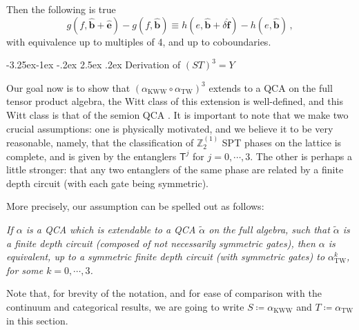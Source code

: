 \documentclass[aps,twocolumn,prx,floatfix,preprintnumbers, nofootinbib,10pt]{revtex4-2}
\makeatletter
\numberwithin{equation}{section}
\theoremstyle{definition}
\theoremstyle{remark}
\theoremstyle{claim}
\newcommand{\be}{\begin{equation}}
\newcommand{\ee}{\end{equation}}
\newcommand{\KWW}{\text{KWW}}
\newcommand{\TW}{\text{TW}}
\newcommand{\aTW}{\alpha_\text{TW}}
\newcommand{\Z}{{\mathbb Z}}
\renewcommand\subsubsection{\@startsection{subsubsection}{3}{\z@}%
                                     {-3.25ex\@plus -1ex \@minus -.2ex}%
                                     {2.5ex \@plus .2ex}%
                                     {\centering\itshape\bfseries\small}}
\renewcommand{\sf}[1]{\mathsf{#1}}
\makeatother
\begin{document}
Then the following is true
\be
g(f, \bm{\hat{b}} + \bm{\hat{e}}) - g(f, \bm{\hat{b}}) \equiv h(e, \bm{\hat{b}} + \delta \bm{\hat{f}}) - h(e, \bm{\hat{b}}) \,,
\ee
with equivalence up to multiples of 4, and up to coboundaries.




\subsubsection{Derivation of $(ST)^3=Y$}
\label{sec:derivation_of_STSTST_Y}

Our goal now is to show that $(\alpha_\KWW \circ \alpha_\TW)^3$ extends to a QCA on the full tensor product algebra, the Witt class of this extension is well-defined, and this Witt class is that of the semion QCA \cite{Shirley_2022}. It is important to note that we make two crucial assumptions: one is physically motivated, and we believe it to be very reasonable, namely, that the classification of $\Z_2^{(1)}$ SPT phases on the lattice is complete, and is given by the entanglers $\sf{T}^j$ for $j = 0, \cdots, 3$. The other is perhaps a little stronger: that any two entanglers of the same phase are related by a finite depth circuit (with each gate being symmetric). 

More precisely, our assumption can be spelled out as follows: 

{ \textit{If $\alpha$ is a QCA which is extendable to a QCA $\tilde{\alpha}$ on the full algebra, such that $\tilde{\alpha}$ is a finite depth circuit (composed of not necessarily symmetric gates), then $\alpha$ is equivalent, up to a symmetric finite depth circuit (with symmetric gates) to $\aTW^k$, for some $k = 0, \cdots, 3$.}}





Note that, for brevity of the notation, and for ease of comparison with the continuum and categorical results, we are going to write $S \coloneqq \alpha_\KWW$ and $T \coloneqq \alpha_\TW$ in this section.
\end{document}
